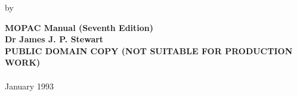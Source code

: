  \topmargin 0pt
 \headheight 12pt %
 \headsep 25pt    %
 \footskip 30pt   %
 \footheight 12pt %
 \oddsidemargin  0.25in  %
 \evensidemargin 0.125in %
 \textwidth 5.875in
 \marginparwidth 0.5in %
 \marginparsep   11pt  %
 \baselineskip  %
 \advance\textheight by \topskip
\def\chem{\rm\everymath={\rm}}
\setcounter{secnumdepth}{2}
\newcommand{\mi}[1]{#1\index{#1}}
\makeindex
\pagestyle{fancyplain}
\renewcommand{\chaptermark}[1]{\markboth{#1}{#1}} %
\renewcommand{\sectionmark}[1]{\markright{\thesection\ #1}}
\cfoot{}

\begin{titlepage}
\begin{center}
{\huge\bf MOPAC Manual (Seventh Edition)}\\
\vfill
\vfill
{\LARGE\bf Dr James J. P. Stewart}\\
\vfill
{\Large\bf PUBLIC DOMAIN COPY (NOT SUITABLE FOR PRODUCTION WORK)\\
\ \\
}
\vfill
{\Large January 1993}
\end{center}
\end{titlepage}

